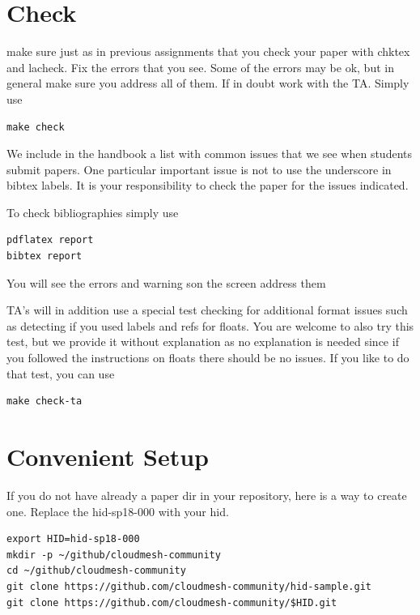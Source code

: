 \section{Check}

make sure just as in previous assignments that you check your paper
with chktex and lacheck. Fix the errors that you see. Some of the
errors may be ok, but in general make sure you address all of them. If
in doubt work with the TA. Simply use

\begin{verbatim}
make check
\end{verbatim}

We include in the handbook a list with common issues that we see when
students submit papers. One particular important issue is not to use
the underscore in bibtex labels. It is your responsibility to check
the paper for the issues indicated.

To check bibliographies simply use

\begin{verbatim}
pdflatex report
bibtex report
\end{verbatim}

You will see the errors and warning son the screen address them

TA's will in addition use a special test checking for additional
format issues such as detecting if you used labels and refs for
floats. You are welcome to also try this test, but we provide it
without explanation as no explanation is needed since if you followed
the instructions on floats there should be no issues. If you like to
do that test, you can use  

\begin{verbatim}
make check-ta
\end{verbatim}

\section{Convenient Setup}

If you do not have already a paper dir in your repository, here is a
way to create one. Replace the hid-sp18-000 with your hid.

\begin{verbatim}
export HID=hid-sp18-000
mkdir -p ~/github/cloudmesh-community
cd ~/github/cloudmesh-community
git clone https://github.com/cloudmesh-community/hid-sample.git
git clone https://github.com/cloudmesh-community/$HID.git
\end{verbatim}

